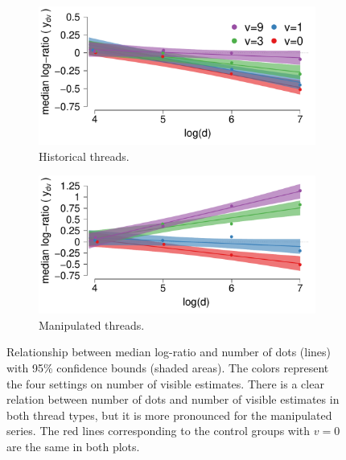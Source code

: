 \documentclass[a4paper,12pt]{article}
\begin{document}
\begin{figure}[!b]
\centering
	\begin{subfigure}[t]{.46\linewidth}
		\centering
		\includegraphics[width=1\linewidth]{med_confidence_h.pdf}	
		\caption{\footnotesize Historical threads.}
		\label{fig: median confidence bounds - historic}
	\end{subfigure}
	\begin{subfigure}[t]{.46\linewidth}
		\centering
		\includegraphics[width=1\linewidth]{med_confidence_m.pdf}		
		\caption{\footnotesize Manipulated threads.}
		\label{fig: median confidence bounds - manipulated}
	\end{subfigure}
	\caption{\footnotesize Relationship between median log-ratio and number of dots (lines) with 95\% confidence bounds (shaded areas). The colors represent the four settings on number of visible estimates. There is a clear relation between number of dots and number of visible estimates in both thread types, but it is more pronounced for the manipulated series. The red lines corresponding to the control groups with $v=0$ are the same in both plots.}
	\label{fig: median confidence bounds}
\end{figure}
\end{document}
